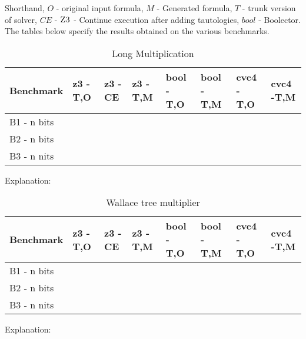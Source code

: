 Shorthand, $O$ - original input formula, $M$ - Generated formula, $T$ - trunk version of solver, $CE$ - $\textsc{Z3}$ - Continue execution after adding tautologies, $bool$ - Boolector.
The tables below specify the results obtained on the various benchmarks. 


\begin{table}[]
\centering
\caption{Long Multiplication}
\label{my-label}
\begin{tabular}{|l|l|l|l|l|l|l|l|}
\hline
Benchmark   & z3 - T,O & z3 - CE & z3 - T,M & bool - T,O & bool - T,M & cvc4 - T,O & cvc4 -T,M \\ \hline
B1 - n bits &          &         &          &            &            &            &           \\ \hline
B2 - n bits &          &         &          &            &            &            &           \\ \hline
B3 - n nits &          &         &          &            &            &            &           \\ \hline
\end{tabular}
\end{table}

Explanation: 

\begin{table}[]
\centering
\caption{Wallace tree multiplier}
\label{my-label}
\begin{tabular}{|l|l|l|l|l|l|l|l|}
\hline
Benchmark   & z3 - T,O & z3 - CE & z3 - T,M & bool - T,O & bool - T,M & cvc4 - T,O & cvc4 -T,M \\ \hline
B1 - n bits &          &         &          &            &            &            &           \\ \hline
B2 - n bits &          &         &          &            &            &            &           \\ \hline
B3 - n nits &          &         &          &            &            &            &           \\ \hline
\end{tabular}
\end{table}

Explanation:







 

